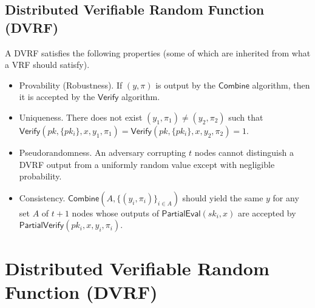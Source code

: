 \documentclass[letterpaper,twocolumn,10pt]{article}
\theoremstyle{definition}
\theoremstyle{remark}
\begin{document}
    \subsection{Distributed Verifiable Random Function (DVRF)}
    \label{appendix:dvrf}
    A DVRF satisfies the following properties (some of which are inherited from what a VRF should satisfy).
    \begin{itemize}
    \item Provability (Robustness). If $(y, \pi)$ is output by the $\mathsf{Combine}$ algorithm, then it is accepted by the $\mathsf{Verify}$ algorithm.
    \item Uniqueness. There does not exist $(y_1, \pi_1) \neq (y_2, \pi_2)$ such that $\mathsf{Verify}(pk, \{pk_i\}, x, y_1, \pi_1) = \mathsf{Verify}(pk, \{pk_i\}, x, y_2, \pi_2) = 1$.
    \item Pseudorandomness. An adversary corrupting $t$ nodes cannot distinguish a DVRF output from a uniformly random value except with negligible probability.
    \item Consistency. $\mathsf{Combine}(A, \{(y_i, \pi_i)\}_{i \in A})$ should yield the same $y$ for any set $A$ of $t + 1$ nodes whose outputs of $\mathsf{PartialEval}(sk_i, x)$ are accepted by $\mathsf{PartialVerify}(pk_i, x, y_i, \pi_i)$.
    \end{itemize}
\fi
\section{Distributed Verifiable Random Function (DVRF)}
\end{document}
